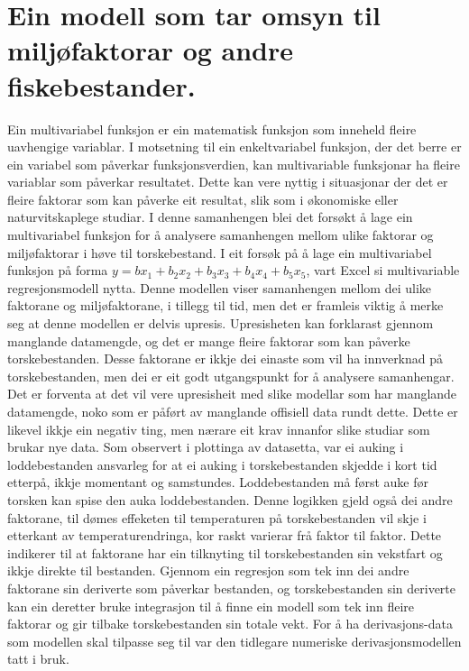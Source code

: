 \documentclass{report}
\begin{document}
\section{Ein modell som tar omsyn til miljøfaktorar og andre fiskebestander.}
Ein multivariabel funksjon er ein matematisk funksjon som inneheld fleire uavhengige variablar. I motsetning til ein enkeltvariabel funksjon, der det berre er ein variabel som påverkar funksjonsverdien, kan multivariable funksjonar ha fleire variablar som påverkar resultatet. Dette kan vere nyttig i situasjonar der det er fleire faktorar som kan påverke eit resultat, slik som i økonomiske eller naturvitskaplege studiar. I denne samanhengen blei det forsøkt å lage ein multivariabel funksjon for å analysere samanhengen mellom ulike faktorar og miljøfaktorar i høve til torskebestand.
I eit forsøk på å lage ein multivariabel funksjon på forma $y=bx_1 +b_2x_2 +b_3x_3 +b_4x_4+b_5x_5$, vart Excel si multivariable regresjonsmodell nytta. Denne modellen viser samanhengen mellom dei ulike faktorane og miljøfaktorane, i tillegg til tid, men det er framleis viktig å merke seg at denne modellen er delvis upresis. Upresisheten kan forklarast gjennom manglande datamengde, og det er mange fleire faktorar som kan påverke torskebestanden. Desse faktorane er ikkje dei einaste som vil ha innverknad på torskebestanden, men dei er eit godt utgangspunkt for å analysere samanhengar. Det er forventa at det vil vere upresisheit med slike modellar som har manglande datamengde, noko som er påført av manglande offisiell data rundt dette. Dette er likevel ikkje ein negativ ting, men nærare eit krav innanfor slike studiar som brukar nye data.
Som observert i plottinga av datasetta, var ei auking i loddebestanden ansvarleg for at ei auking i torskebestanden skjedde i kort tid etterpå, ikkje momentant og samstundes. Loddebestanden må først auke før torsken kan spise den auka loddebestanden. Denne logikken gjeld også dei andre faktorane, til dømes effeketen til temperaturen på torskebestanden vil skje i etterkant av temperaturendringa, kor raskt varierar frå faktor til faktor.
Dette indikerer til at faktorane har ein tilknyting til torskebestanden sin vekstfart og ikkje direkte til bestanden. Gjennom ein regresjon som tek inn dei andre faktorane sin deriverte som påverkar bestanden, og torskebestanden sin deriverte kan ein deretter bruke integrasjon til å finne ein modell som tek inn fleire faktorar og gir tilbake torskebestanden sin totale vekt.
For å ha derivasjons-data som modellen skal tilpasse seg til var den tidlegare numeriske derivasjonsmodellen tatt i bruk.
\end{document}
